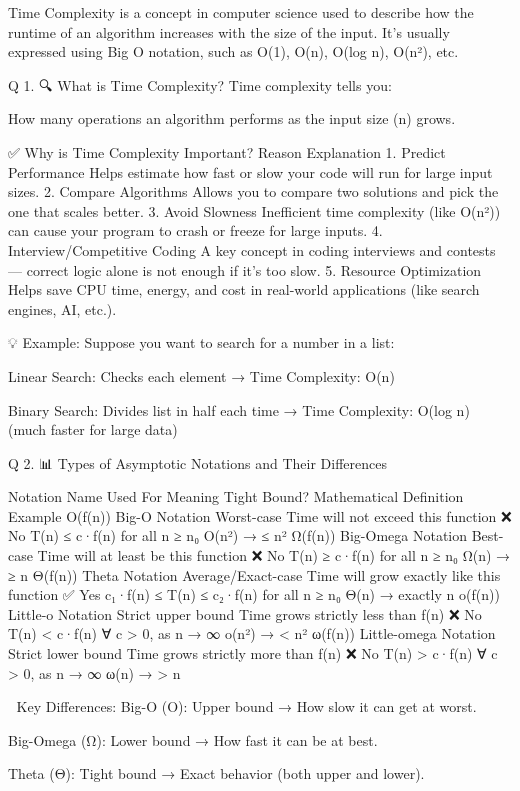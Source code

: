 Time Complexity is a concept in computer science used to describe how the runtime of an algorithm increases with the size of the input. It's usually expressed using Big O notation, such as O(1), O(n), O(log n), O(n²), etc.

Q 1. 🔍 What is Time Complexity?
Time complexity tells you:

How many operations an algorithm performs as the input size (n) grows.

✅ Why is Time Complexity Important?
Reason	Explanation
1. Predict Performance	Helps estimate how fast or slow your code will run for large input sizes.
2. Compare Algorithms	Allows you to compare two solutions and pick the one that scales better.
3. Avoid Slowness	Inefficient time complexity (like O(n²)) can cause your program to crash or freeze for large inputs.
4. Interview/Competitive Coding	A key concept in coding interviews and contests — correct logic alone is not enough if it's too slow.
5. Resource Optimization	Helps save CPU time, energy, and cost in real-world applications (like search engines, AI, etc.).

💡 Example:
Suppose you want to search for a number in a list:

Linear Search: Checks each element → Time Complexity: O(n)

Binary Search: Divides list in half each time → Time Complexity: O(log n) (much faster for large data)


Q 2. 📊 Types of Asymptotic Notations and Their Differences

Notation	Name	Used For	Meaning	Tight Bound?	Mathematical Definition	Example
O(f(n))	Big-O Notation	Worst-case	Time will not exceed this function	❌ No	T(n) ≤ c·f(n) for all n ≥ n₀	O(n²) → ≤ n²
Ω(f(n))	Big-Omega Notation	Best-case	Time will at least be this function	❌ No	T(n) ≥ c·f(n) for all n ≥ n₀	Ω(n) → ≥ n
Θ(f(n))	Theta Notation	Average/Exact-case	Time will grow exactly like this function	✅ Yes	c₁·f(n) ≤ T(n) ≤ c₂·f(n) for all n ≥ n₀	Θ(n) → exactly n
o(f(n))	Little-o Notation	Strict upper bound	Time grows strictly less than f(n)	❌ No	T(n) < c·f(n) ∀ c > 0, as n → ∞	o(n²) → < n²
ω(f(n))	Little-omega Notation	Strict lower bound	Time grows strictly more than f(n)	❌ No	T(n) > c·f(n) ∀ c > 0, as n → ∞	ω(n) → > n

📌 Key Differences:
Big-O (O): Upper bound → How slow it can get at worst.

Big-Omega (Ω): Lower bound → How fast it can be at best.

Theta (Θ): Tight bound → Exact behavior (both upper and lower).

